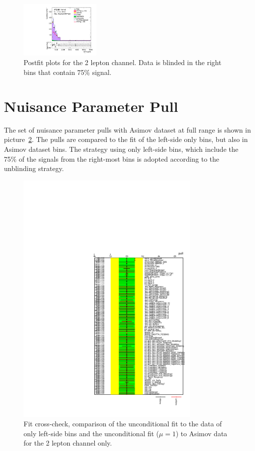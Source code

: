 \begin{figure}[ht]
    \includegraphics[width=0.35\textwidth]{figures/2lep/FitResults/Region_distMTagResJets_DCRVjetFid_BMin0_T0_Y6051_incTag1_J2_L2_incJet1_GlobalFit_unconditionnal_mu1.pdf}
    \caption{Postfit plots for the 2 lepton channel. Data is blinded in the right bins that contain 75\% signal.}
       \label{fig:fit_2lep_postfit}
\end{figure}

\section{Nuisance Parameter Pull}
The set of nuisance parameter pulls with Asimov dataset at full range is shown in picture~\ref{fig:fit_2lep_pullcomp}.
The pulls are compared to the fit of the left-side only bins, but also in Asimov dataset bins.
The strategy using only left-side bins, which include the 75\% of the signals from the right-most bins is adopted according to the unblinding strategy.
\begin{figure}[ht]
      \centering
        \includegraphics[width=0.8\textwidth]{figures/2lep/FitResults/fill_2lep_pullcomp.pdf}
        \caption{Fit cross-check, comparison of the unconditional fit to the data of only left-side bins and the unconditional fit ($\mu=1$) to Asimov data for the 2 lepton channel only.}
       \label{fig:fit_2lep_pullcomp}
\end{figure}
